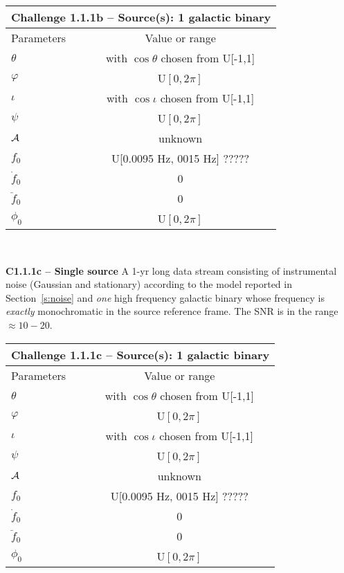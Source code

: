 \documentclass[11pt]{report}
\begin{document}
\begin{description}
\begin{center}
\begin{tabular}{l|c}
\hline \hline
\multicolumn{2}{c}{{\bf Challenge 1.1.1b -- Source(s): 1 galactic binary}} \\
\hline
Parameters & Value or range \\
\hline
$\theta$          & with $\cos\theta$ chosen from U[-1,1]\\
$\varphi$         & U$[0,2\pi]$ \\ 
$\iota$           & with $\cos\iota$ chosen from U[-1,1]\\ 
$\psi$            & U$[0,2\pi]$ \\
${\cal A}$        & unknown \\
$f_0$             & U[0.0095 Hz, 0015 Hz] ?????\\ 
$\dot{f}_0$       & 0 \\ 
$\ddot{f}_0$      & 0\\ 
$\phi_0$          & U$[0,2\pi]$ \\
\hline \hline
\end{tabular} \\
\end{center}

\item {\bf C1.1.1c -- Single source} A 1-yr long data stream consisting of instrumental noise (Gaussian and stationary) according to the model reported in Section~\ref{s:noise} and {\em one} high frequency galactic binary whose frequency is {\em exactly} monochromatic in the source reference frame. The SNR is in the range $\approx 10-20$. 

\begin{center}
\begin{tabular}{l|c}
\hline \hline
\multicolumn{2}{c}{{\bf Challenge 1.1.1c -- Source(s): 1 galactic binary}} \\
\hline
Parameters & Value or range \\
\hline
$\theta$          & with $\cos\theta$ chosen from U[-1,1]\\
$\varphi$         & U$[0,2\pi]$ \\ 
$\iota$           & with $\cos\iota$ chosen from U[-1,1]\\ 
$\psi$            & U$[0,2\pi]$ \\
${\cal A}$        & unknown \\
$f_0$             & U[0.0095 Hz, 0015 Hz] ?????\\ 
$\dot{f}_0$       & 0 \\ 
$\ddot{f}_0$      & 0\\ 
$\phi_0$          & U$[0,2\pi]$ \\
\hline \hline
\end{tabular} \\
\end{center}



\end{description}
\end{document}
